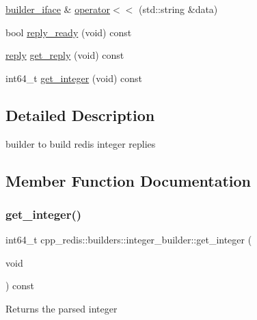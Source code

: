 \begin{DoxyCompactItemize}
\hyperlink{classcpp__redis_1_1builders_1_1builder__iface}{builder\+\_\+iface} \& \hyperlink{classcpp__redis_1_1builders_1_1integer__builder_ae29f074134f7269db7f947b0fcbe312e}{operator$<$$<$} (std\+::string \&data)
\item 
bool \hyperlink{classcpp__redis_1_1builders_1_1integer__builder_a4893dc36d06d75094bb4fe3fbc826966}{reply\+\_\+ready} (void) const
\item 
\hyperlink{classcpp__redis_1_1reply}{reply} \hyperlink{classcpp__redis_1_1builders_1_1integer__builder_a25221763ba6f8b740458c673945208e0}{get\+\_\+reply} (void) const
\item 
int64\+\_\+t \hyperlink{classcpp__redis_1_1builders_1_1integer__builder_af68431c4c81242c1930b3b4feb2028e5}{get\+\_\+integer} (void) const
\end{DoxyCompactItemize}


\subsection{Detailed Description}
builder to build redis integer replies 

\subsection{Member Function Documentation}
\mbox{\label{classcpp__redis_1_1builders_1_1integer__builder_af68431c4c81242c1930b3b4feb2028e5}} 
\subsubsection{\texorpdfstring{get\+\_\+integer()}{get\_integer()}}
{\footnotesize\ttfamily int64\+\_\+t cpp\+\_\+redis\+::builders\+::integer\+\_\+builder\+::get\+\_\+integer (\begin{DoxyParamCaption}\item[{void}]{ }\end{DoxyParamCaption}) const}

\begin{DoxyReturn}{Returns}
the parsed integer 
\end{DoxyReturn}
\mbox{\label{classcpp__redis_1_1builders_1_1integer__builder_a25221763ba6f8b740458c673945208e0}} 
